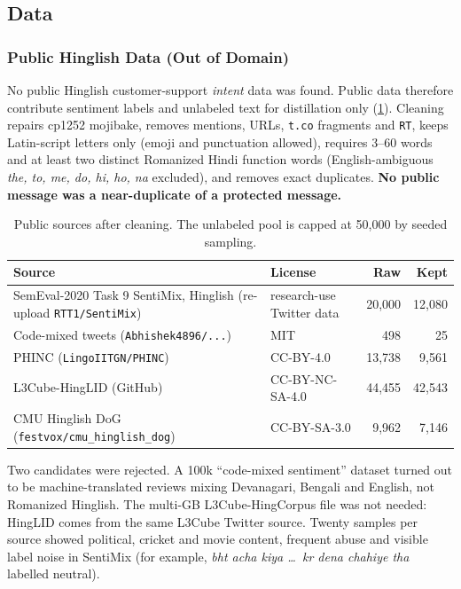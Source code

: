 \documentclass[11pt,a4paper]{article}
\theoremstyle{remark}
\newcommand{\hi}[1]{\textit{#1}}                       %
\begin{document}
\subsection{Data}
\label{sec:v12data}

\subsubsection{Public Hinglish Data (Out of Domain)}
No public Hinglish customer-support \emph{intent} data was found. Public data
therefore contribute sentiment labels and unlabeled text for distillation only
(\cref{tab:v12public}). Cleaning repairs cp1252 mojibake, removes mentions,
URLs, \texttt{t.co} fragments and \texttt{RT}, keeps Latin-script letters only
(emoji and punctuation allowed), requires 3--60 words and at least two distinct
Romanized Hindi function words (English-ambiguous \hi{the, to, me, do, hi, ho,
na} excluded), and removes exact duplicates. \textbf{No public message was a
near-duplicate of a protected message.}
\begin{table}[h]
\centering
\small
\caption{Public sources after cleaning. The unlabeled pool is capped at 50{,}000 by seeded sampling.}
\label{tab:v12public}

\begin{tabularx}{\linewidth}{@{}X l r r@{}}
\toprule
Source & License & Raw & Kept \\
\midrule

SemEval-2020 Task 9 SentiMix, Hinglish
(re-upload \texttt{RTT1/SentiMix})
& research-use Twitter data
& 20{,}000
& 12{,}080 \\

Code-mixed tweets (\texttt{Abhishek4896/...})
& MIT
& 498
& 25 \\

PHINC (\texttt{LingoIITGN/PHINC})
& CC-BY-4.0
& 13{,}738
& 9{,}561 \\

L3Cube-HingLID (GitHub)
& CC-BY-NC-SA-4.0
& 44{,}455
& 42{,}543 \\

CMU Hinglish DoG (\texttt{festvox/cmu\_hinglish\_dog})
& CC-BY-SA-3.0
& 9{,}962
& 7{,}146 \\

\bottomrule
\end{tabularx}
\end{table}

Two candidates were rejected. A 100k ``code-mixed sentiment'' dataset turned out
to be machine-translated reviews mixing Devanagari, Bengali and English, not
Romanized Hinglish. The multi-GB L3Cube-HingCorpus file was not needed: HingLID
comes from the same L3Cube Twitter source. Twenty samples per source showed
political, cricket and movie content, frequent abuse and visible label noise in
SentiMix (for example, \hi{bht acha kiya \dots\ kr dena chahiye tha} labelled
neutral).
\end{document}

